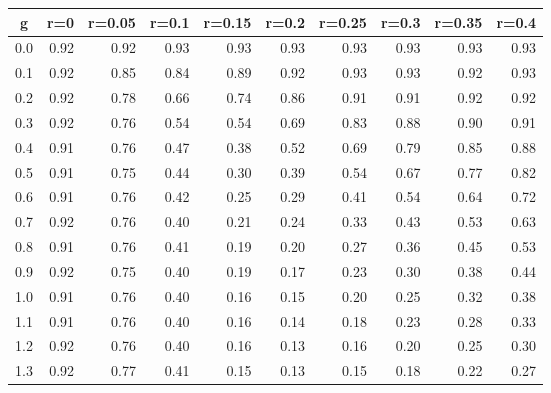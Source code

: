%
\begin{table}[!tbp]
 \begin{center}
 \begin{tabular}{rrrrrrrrrr}\hline\hline
\multicolumn{1}{c}{g}&\multicolumn{1}{c}{r=0}&\multicolumn{1}{c}{r=0.05}&\multicolumn{1}{c}{r=0.1}&\multicolumn{1}{c}{r=0.15}&\multicolumn{1}{c}{r=0.2}&\multicolumn{1}{c}{r=0.25}&\multicolumn{1}{c}{r=0.3}&\multicolumn{1}{c}{r=0.35}&\multicolumn{1}{c}{r=0.4}\tabularnewline
\hline
0.0&0.92&0.92&0.93&0.93&0.93&0.93&0.93&0.93&0.93\tabularnewline
0.1&0.92&0.85&0.84&0.89&0.92&0.93&0.93&0.92&0.93\tabularnewline
0.2&0.92&0.78&0.66&0.74&0.86&0.91&0.91&0.92&0.92\tabularnewline
0.3&0.92&0.76&0.54&0.54&0.69&0.83&0.88&0.90&0.91\tabularnewline
0.4&0.91&0.76&0.47&0.38&0.52&0.69&0.79&0.85&0.88\tabularnewline
0.5&0.91&0.75&0.44&0.30&0.39&0.54&0.67&0.77&0.82\tabularnewline
0.6&0.91&0.76&0.42&0.25&0.29&0.41&0.54&0.64&0.72\tabularnewline
0.7&0.92&0.76&0.40&0.21&0.24&0.33&0.43&0.53&0.63\tabularnewline
0.8&0.91&0.76&0.41&0.19&0.20&0.27&0.36&0.45&0.53\tabularnewline
0.9&0.92&0.75&0.40&0.19&0.17&0.23&0.30&0.38&0.44\tabularnewline
1.0&0.91&0.76&0.40&0.16&0.15&0.20&0.25&0.32&0.38\tabularnewline
1.1&0.91&0.76&0.40&0.16&0.14&0.18&0.23&0.28&0.33\tabularnewline
1.2&0.92&0.76&0.40&0.16&0.13&0.16&0.20&0.25&0.30\tabularnewline
1.3&0.92&0.77&0.41&0.15&0.13&0.15&0.18&0.22&0.27\tabularnewline
\hline
\end{tabular}

\end{center}

\end{table}

